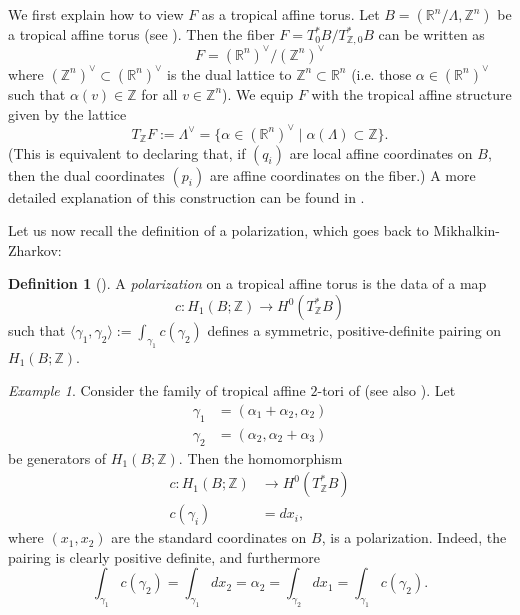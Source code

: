 \documentclass[10pt]{amsart}
\theoremstyle{definition}
\newtheorem{definition}[thm]{Definition}
\theoremstyle{remark}
\newtheorem{example}[thm]{Example}
\def\R{\mathbb{R}}
\def\Z{\mathbb{Z}}
\newcommand{\vspan}[1]{\langle #1 \rangle}
\begin{document}
We first explain how to view $F$ as a tropical affine torus.
Let $B = (\R^n/\Lambda, \Z^n)$ be a tropical affine torus (see ).
Then the fiber $F = T^*_0 B / T^*_{\Z,0} B$ can be written as 
$$
F = (\R^n)^\vee / (\Z^n)^\vee
$$
where $(\Z^n)^\vee \subset (\R^n)^\vee$ is the dual lattice to $\Z^n \subset \R^n$ (i.e. those $\alpha \in (\R^n)^\vee$ such that $\alpha(v) \in \Z$ for all $v \in \Z^n$).
We equip $F$ with the tropical affine structure given by the lattice
$$
T_\Z F := \Lambda^\vee = \{\alpha \in (\R^n)^\vee \mid \alpha(\Lambda) \subset \Z\}.
$$
(This is equivalent to declaring that, if $(q_i)$ are local affine coordinates on $B$, then the dual coordinates $(p_i)$ are affine coordinates on the fiber.)
A more detailed explanation of this construction can be found in .



Let us now recall the definition of a polarization, which goes back to Mikhalkin-Zharkov:
\begin{definition}[\cite{mikhalkin2008tropical}]\label{def:polarized_torus}
    A \emph{polarization} on a tropical affine torus is the data of a map 
    $$
    c: H_1(B;\Z) \to H^0(T^*_\Z B)
    $$
    such that $\vspan{\gamma_1,\gamma_2}:= \int_{\gamma_1} c(\gamma_2)$ defines a symmetric, positive-definite pairing on $H_1(B;\Z)$.
\end{definition}

\begin{example}\label{ex:polarization_on_torus}
    Consider the family of tropical affine $2$-tori of  (see also ).
    Let 
    \begin{align*}
        \gamma_1 &= (\alpha_1+\alpha_2, \alpha_2)\\
        \gamma_2 &= (\alpha_2, \alpha_2 + \alpha_3)
    \end{align*}
    be generators of $H_1(B;\Z)$.
    Then the homomorphism
    \begin{align*}
        c: H_1(B;\Z) &\to H^0(T^*_\Z B)\\
        c(\gamma_i) &= dx_i,
    \end{align*}
    where $(x_1,x_2)$ are the standard coordinates on $B$, is a polarization.
    Indeed, the pairing is clearly positive definite, and furthermore
    $$
        \int_{\gamma_1} c(\gamma_2) = \int_{\gamma_1} dx_2 = \alpha_2 = \int_{\gamma_2} dx_1 = \int_{\gamma_1} c(\gamma_2).
    $$
\end{example}
\end{document}

